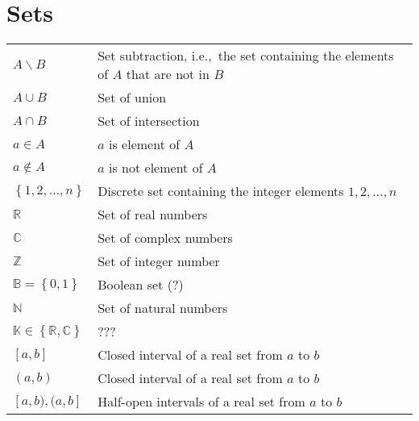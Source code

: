 \documentclass{article}
\begin{document}
\section{Sets}
\begin{table}[H]
    \begin{tabularx}{\textwidth}{XX}
        \(A \backslash B\) & Set subtraction, i.e., the set containing the elements of \(A\) that are not in \(B\)\\
        \(A \cup B\) & Set of union\\
        \(A \cap B\) & Set of intersection\\
        \(a \in A\)& \(a\) is element of \(A\) \\
        \(a \notin A\)& \(a\) is not element of \(A\) \\
        \(\left\{ 1,2, \dots, n \right\}\) & Discrete set containing the integer elements \(1,2, \dots, n\)\\
        \(\mathbb{R}\) & Set of real numbers\\
        \(\mathbb{C}\)& Set of complex numbers\\
        \(\mathbb{Z}\) & Set of integer number\\
        \(\mathbb{B} = \left\{ 0, 1 \right\}\) & Boolean set (?)\\ %
        \(\mathbb{N}\) & Set of natural numbers\\
        \(\mathbb{K} \in \left\{ \mathbb{R}, \mathbb{C} \right\}\) & ???\\
        \([a, b]\) & Closed interval of a real set from \(a\) to \(b\)\\
        \((a, b)\) & Closed interval of a real set from \(a\) to \(b\)\\
        \([a, b), (a, b]\) & Half-open intervals of a real set from \(a\) to \(b\)\\
    \end{tabularx}
\end{table}
\end{document}
